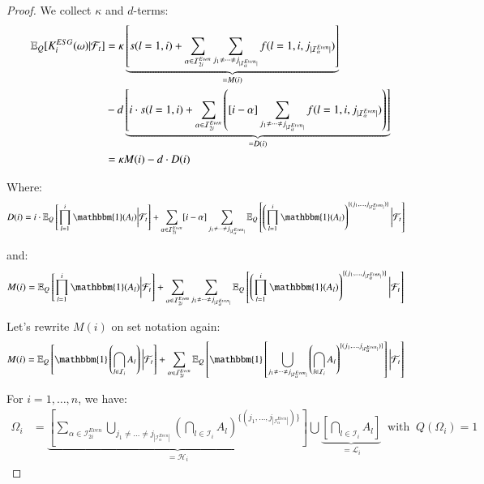 \begin{proof}
\newpage 

We collect $\kappa$ and $d$-terms:
\begin{align*}
\mathbb{E}_{Q}[K_{i}^{ESG}(\omega)|\mathcal{F}_{t}]
&= 
\kappa
\underbrace{
\left[
s(l=1,i) + \sum_{\alpha \in \mathcal{I}_{2i}^{Even}}\sum_{
j_{1}\neq \dots \neq j_{|\mathcal{I}_{\alpha}^{Even}|}
}
f(l=1, i, j_{|\mathcal{I}_{\alpha}^{Even}|}) 
\right]
}_{=M(i)}
\\ 
&-d
\underbrace{
\left[
i\cdot s(l=1,i) + \sum_{\alpha \in \mathcal{I}_{2i}^{Even}}
\left(
[i-\alpha]\sum_{
j_{1}\neq \dots \neq j_{|\mathcal{I}_{\alpha}^{Even}|}
}
f(l=1, i, j_{|\mathcal{I}_{\alpha}^{Even}|})
\right)
\right]
}_{=D(i)} \\ 
&= 
\kappa M(i) -d\cdot D(i)
\end{align*}

Where: 
\begin{align*}
D(i) &= 
i\cdot \E_{Q}\left[
\prod_{l=1}^{i}\mathbbm{1}(A_{l})\bigg{|}\F_{t}
\right]
+ 
\sum_{\alpha \in \mathcal{I}_{2i}^{Even}}[i-\alpha]
\sum_{
j_{1}\neq \dots \neq j_{|\mathcal{I}_{\alpha}^{Even}|}
}
\E_{Q}\left[
\left(
\prod_{l=1}^{i}\mathbbm{1}(A_{l})
\right)^{
\{
(j_{1}, \dots , j_{|\mathcal{I}_{\alpha}^{Even}|})
\}
}
\bigg{|}\F_{t}
\right]
\end{align*}

and: 
\begin{align*}
M(i) &= 
\E_{Q}\left[
\prod_{l=1}^{i}\mathbbm{1}(A_{l})\bigg{|}\F_{t}
\right]  
+\sum_{\alpha \in \mathcal{I}_{2i}^{Even}}
\sum_{
j_{1}\neq \dots \neq j_{|\mathcal{I}_{\alpha}^{Even}|}
}
\E_{Q}\left[
\left(
\prod_{l=1}^{i}\mathbbm{1}(A_{l})
\right)^{
\{
(j_{1}, \dots , j_{|\mathcal{I}_{\alpha}^{Even}|})
\}
}
\bigg{|}\F_{t}
\right]
\end{align*}

Let's rewrite $M(i)$ on set notation again: 
\begin{align*}
M(i) &= 
\E_{Q}\left[
\mathbbm{1}\left(
\bigcap_{l \in \mathcal{I}_{i}}A_{l}
\right)
\bigg{|}\F_{t}
\right]
+\sum_{\alpha \in \mathcal{I}_{2i}^{Even}}
\E_{Q}\left[
\mathbbm{1}
\left[
\bigcup_{
j_{1} \neq \dots \neq j_{|\mathcal{I}_{\alpha}^{Even}|}
}
\left(
\bigcap_{l \in \mathcal{I}_{i}}A_{l}
\right)^{
\{
(j_{1}, \dots, j_{|\mathcal{I}_{\alpha}^{Even}|})
\}
}
\right]
\bigg{|}\F_{t}
\right]
\end{align*}

For $i = 1, \dots, n$, we have: 
\begin{align*}
\Omega_{i} 
&= 
\underbrace{
\left[
\sum_{\alpha \in \mathcal{I}_{2i}^{Even}}
\bigcup_{
j_{1} \neq \dots \neq j_{|\mathcal{I}_{\alpha}^{Even}|}
}
\left(
\bigcap_{l \in \mathcal{I}_{i}}A_{l}
\right)^{
\{
(j_{1}, \dots, j_{|\mathcal{I}_{\alpha}^{Even}|})
\}
}
\right]
}_{=\mathcal{H}_{i}}
\bigcup
\underbrace{
\left[
\bigcap_{l \in \mathcal{I}_{i}}A_{l}
\right]
}_{=\mathcal{L}_{i}}
\;\; 
\text{with}\;\; 
Q(\Omega_{i}) = 1
\end{align*} 


\end{proof}
